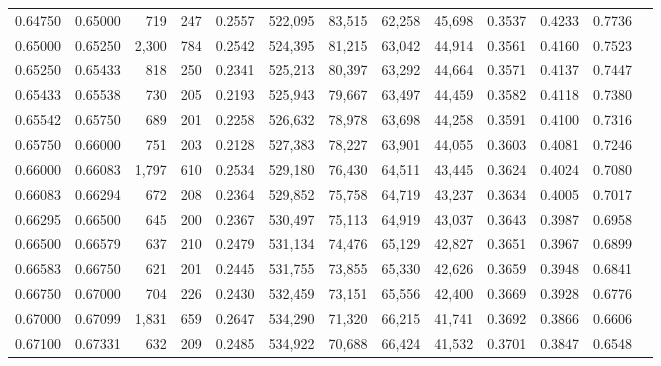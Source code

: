 \begin{tabular}{rrrrrrrrrrrrr}
0.64750 & 0.65000 &   719 & 247 &                                     0.2557 & 522,095 &  83,515 &  62,258 &  45,698 & 0.3537 & 0.4233 & 0.7736 \\
0.65000 & 0.65250 & 2,300 & 784 &                                     0.2542 & 524,395 &  81,215 &  63,042 &  44,914 & 0.3561 & 0.4160 & 0.7523 \\
0.65250 & 0.65433 &   818 & 250 &                                     0.2341 & 525,213 &  80,397 &  63,292 &  44,664 & 0.3571 & 0.4137 & 0.7447 \\
0.65433 & 0.65538 &   730 & 205 &                                     0.2193 & 525,943 &  79,667 &  63,497 &  44,459 & 0.3582 & 0.4118 & 0.7380 \\
0.65542 & 0.65750 &   689 & 201 &                                     0.2258 & 526,632 &  78,978 &  63,698 &  44,258 & 0.3591 & 0.4100 & 0.7316 \\
0.65750 & 0.66000 &   751 & 203 &                                     0.2128 & 527,383 &  78,227 &  63,901 &  44,055 & 0.3603 & 0.4081 & 0.7246 \\
0.66000 & 0.66083 & 1,797 & 610 &                                     0.2534 & 529,180 &  76,430 &  64,511 &  43,445 & 0.3624 & 0.4024 & 0.7080 \\
0.66083 & 0.66294 &   672 & 208 &                                     0.2364 & 529,852 &  75,758 &  64,719 &  43,237 & 0.3634 & 0.4005 & 0.7017 \\
0.66295 & 0.66500 &   645 & 200 &                                     0.2367 & 530,497 &  75,113 &  64,919 &  43,037 & 0.3643 & 0.3987 & 0.6958 \\
0.66500 & 0.66579 &   637 & 210 &                                     0.2479 & 531,134 &  74,476 &  65,129 &  42,827 & 0.3651 & 0.3967 & 0.6899 \\
0.66583 & 0.66750 &   621 & 201 &                                     0.2445 & 531,755 &  73,855 &  65,330 &  42,626 & 0.3659 & 0.3948 & 0.6841 \\
0.66750 & 0.67000 &   704 & 226 &                                     0.2430 & 532,459 &  73,151 &  65,556 &  42,400 & 0.3669 & 0.3928 & 0.6776 \\
0.67000 & 0.67099 & 1,831 & 659 &                                     0.2647 & 534,290 &  71,320 &  66,215 &  41,741 & 0.3692 & 0.3866 & 0.6606 \\
0.67100 & 0.67331 &   632 & 209 &                                     0.2485 & 534,922 &  70,688 &  66,424 &  41,532 & 0.3701 & 0.3847 & 0.6548 \\

\end{tabular}
